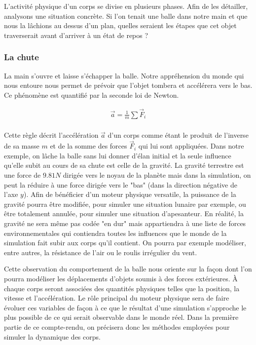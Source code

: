 L'activité physique d'un corps se divise en plusieurs phases. Afin de
les détailler, analysons une situation concrète. Si l'on tenait une
balle dans notre main et que nous la lâchions au dessus d'un plan,
quelles seraient les étapes que cet objet traverserait avant d'arriver
à un état de repos ?

\subsubsection{La chute}

La main s'ouvre et laisse s'échapper la balle. Notre appréhension du
monde qui nous entoure nous permet de prévoir que l'objet tombera et
accélérera vers le bas. Ce phénomène est quantifié par la seconde loi
de Newton.

\begin{align*}
  \vec{a} = \frac{1}{m} \sum{\vec{F}_i} \\
\end{align*}

Cette règle décrit l'accélération $\vec{a}$ d'un corps comme étant le
produit de l'inverse de sa masse $m$ et de la somme des forces
$\vec{F}_i$ qui lui sont appliquées. Dans notre exemple, on lâche la
balle sans lui donner d'élan initial et la seule influence qu'elle
subit au cours de sa chute est celle de la gravité. La gravité
terrestre est une force de $9.81 N$ dirigée vers le noyau de la
planète mais dans la simulation, on peut la réduire à une force
dirigée vers le "bas" (dans la direction négative de l'axe $y$). Afin
de bénéficier d'un moteur physique versatile, la puissance de la
gravité pourra être modifiée, pour simuler une situation lunaire par
exemple, ou être totalement annulée, pour simuler une situation
d'apesanteur. En réalité, la gravité ne sera même pas codée "en dur"
mais appartiendra à une liste de forces environnementales qui
contiendra toutes les influences que le monde de la simulation fait
subir aux corps qu'il contient. On pourra par exemple modéliser, entre
autres, la résistance de l'air ou le roulis irrégulier du vent.

Cette observation du comportement de la balle nous oriente sur la
façon dont l'on pourra modéliser les déplacements d'objets soumis à
des forces extérieures. \`A chaque corps seront associées des
quantités physiques telles que la position, la vitesse et
l'accélération. Le rôle principal du moteur physique sera de faire
évoluer ces variables de façon à ce que le résultat d'une simulation
s'approche le plus possible de ce qui serait observable dans le monde
réel. Dans la première partie de ce compte-rendu, on précisera donc
les méthodes employées pour simuler la dynamique des corps.

